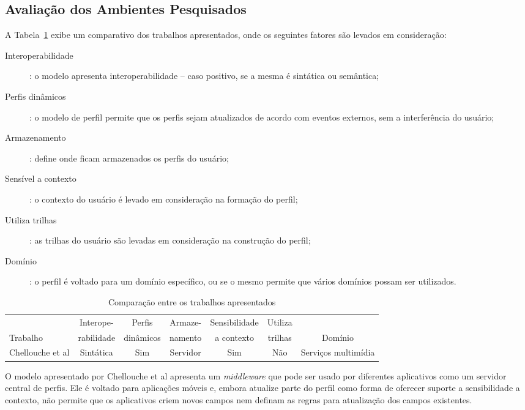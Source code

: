 \documentclass[a4paper]{article}
\begin{document}
\subsection{Avaliação dos Ambientes Pesquisados}

A Tabela~\ref{tab:comparacao} exibe um comparativo dos trabalhos apresentados, onde os seguintes fatores são levados em consideração:

\begin{description}
  \item[Interoperabilidade]: o modelo apresenta interoperabilidade -- caso positivo, se a mesma é sintática ou semântica;
  \item[Perfis dinâmicos]: o modelo de perfil permite que os perfis sejam atualizados de acordo com eventos externos, sem a interferência do usuário;
  \item[Armazenamento]: define onde ficam armazenados os perfis do usuário;
  \item[Sensível a contexto]: o contexto do usuário é levado em consideração na formação do perfil;
  \item[Utiliza trilhas]: as trilhas do usuário são levadas em consideração na construção do perfil;
  \item[Domínio]: o perfil é voltado para um domínio específico, ou se o mesmo permite que vários domínios possam ser utilizados.
\end{description}

\begin{table}\centering\footnotesize
  \begin{tabular*}{1.15\textwidth}{@{}lcccccc@{}}
    \toprule
                                         & Interope-  & Perfis    & Armaze- & Sensibilidade & Utiliza & \\
    Trabalho                             & rabilidade & dinâmicos & namento & a contexto    & trilhas & Domínio \\
    \midrule
    Chellouche et al \cite{chellouche10} & Sintática  & Sim       & Servidor& Sim           & Não     & Serviços multimídia \\
    \bottomrule
  \end{tabular*}
  \caption{Comparação entre os trabalhos apresentados}
  \label{tab:comparacao}
\end{table}

O modelo apresentado por Chellouche et al\cite{chellouche10} apresenta um \emph{middleware} que pode ser usado por diferentes aplicativos como um servidor central de perfis. Ele é voltado para aplicações móveis e, embora atualize parte do perfil como forma de oferecer suporte a sensibilidade a contexto, não permite que os aplicativos criem novos campos nem definam as regras para atualização dos campos existentes.




\begin{small}
  
\end{small}
\end{document}
